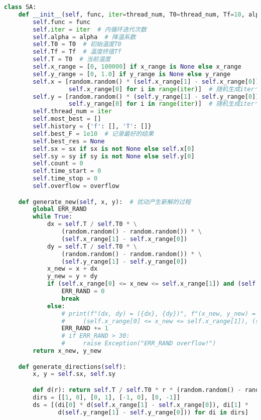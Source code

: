 \begin{lstlisting}[language=Python,breaklines=true]
class SA:
    def __init__(self, func, iter=thread_num, T0=thread_num, Tf=10, alpha=0.99, x_range=None, y_range=None, sx=None, sy=None, overflow=5):
        self.func = func
        self.iter = iter  # 内循环迭代次数
        self.alpha = alpha  # 降温系数
        self.T0 = T0  # 初始温度T0
        self.Tf = Tf  # 温度终值Tf
        self.T = T0  # 当前温度
        self.x_range = [0, 100000] if x_range is None else x_range
        self.y_range = [0, 1.0] if y_range is None else y_range
        self.x = [random.random() * (self.x_range[1] - self.x_range[0]) +
                  self.x_range[0] for i in range(iter)]  # 随机生成iter个x的值
        self.y = [random.random() * (self.y_range[1] - self.y_range[0]) +
                  self.y_range[0] for i in range(iter)]  # 随机生成iter个y的值
        self.thread_num = iter
        self.most_best = []
        self.history = {'f': [], 'T': []}
        self.best_F = 1e10  # 记录最好的结果
        self.best_res = None
        self.sx = sx if sx is not None else self.x[0]
        self.sy = sy if sy is not None else self.y[0]
        self.count = 0
        self.time_start = 0
        self.time_stop = 0
        self.overflow = overflow

    def generate_new(self, x, y):  # 扰动产生新解的过程
        global ERR_RAND
        while True:
            dx = self.T / self.T0 * \
                (random.random() - random.random()) * \
                (self.x_range[1] - self.x_range[0])
            dy = self.T / self.T0 * \
                (random.random() - random.random()) * \
                (self.y_range[1] - self.y_range[0])
            x_new = x + dx
            y_new = y + dy
            if (self.x_range[0] <= x_new <= self.x_range[1]) and (self.y_range[0] <= y_new <= self.y_range[1]):
                ERR_RAND = 0
                break
            else:
                # print(f"(dx, dy) = ({dx}, {dy})", f"(x_new, y_new) = ({x_new}, {y_new})",
                #     (self.x_range[0] <= x_new <= self.x_range[1]), (self.y_range[0] <= y_new <= self.y_range[1]))
                ERR_RAND += 1
                # if ERR_RAND > 30:
                #     raise Exception("ERR_RAND overflow!")
        return x_new, y_new

    def generate_directions(self):
        x, y = self.sx, self.sy

        def d(r): return self.T / self.T0 * r * (random.random() - random.random())
        dirs = [[1, 0], [0, 1], [-1, 0], [0, -1]]
        ds = [(di[0] * d(self.x_range[1] - self.x_range[0]), di[1] *
               d(self.y_range[1] - self.y_range[0])) for di in dirs]


\end{lstlisting}
